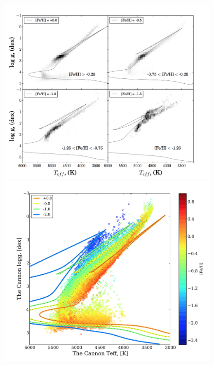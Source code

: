 \documentclass[12pt, preprint]{aastex}
\begin{document}

\begin{figure}[!h]
\centering
  \includegraphics[scale=0.25]{./plots/iso1.png}
  \hspace{-20pt}
    \includegraphics[scale=0.25]{./plots/iso1a.png}

\end{figure}
\end{document}
